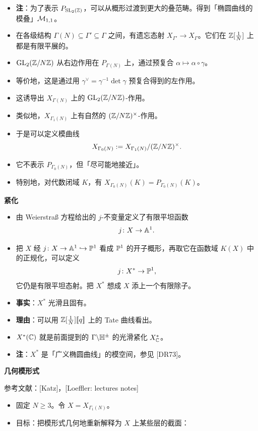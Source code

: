 \begin{itemize}
\item \textbf{注}：为了表示 $P_{\operatorname{SL}_2(\mathbb{Z})}$，可以从概形过渡到更大的叠范畴。得到「椭圆曲线的模叠」$\mathcal{M}_{1,1}$。
\item 在各级结构 $\Gamma(N)\subseteq\Gamma'\subseteq\Gamma$ 之间，有遗忘态射 $X_{\Gamma'}\to X_\Gamma$。它们在 $\mathbb{Z}[\frac1N]$ 上都是有限平展的。
\item $\operatorname{GL}_2(\mathbb{Z}/N\mathbb{Z})$ 从右边作用在 $P_{\Gamma(N)}$ 上，通过预复合 $\alpha\mapsto\alpha\circ\gamma$。
\item 等价地，这是通过用 $\gamma^\vee=\gamma^{-1}\det\gamma$ 预复合得到的左作用。
\item 这诱导出 $X_{\Gamma(N)}$ 上的 $\operatorname{GL}_2(\mathbb{Z}/N\mathbb{Z})$-作用。
\item 类似地，$X_{\Gamma_1(N)}$ 上有自然的 $(\mathbb{Z}/N\mathbb{Z})^\times$-作用。
\item 于是可以定义模曲线
\[
X_{\Gamma_0(N)}:=X_{\Gamma_1(N)}/(\mathbb{Z}/N\mathbb{Z})^\times .
\]
\item 它不表示 $P_{\Gamma_0(N)}$，但「尽可能地接近」。
\item 特别地，对代数闭域 $K$，有 $X_{\Gamma_0(N)}(K)=P_{\Gamma_0(N)}(K)$。
\end{itemize}

\medskip
\noindent\textbf{紧化}
\begin{itemize}
\item 由 Weierstraß 方程给出的 $j$-不变量定义了有限平坦函数
\[
j\colon X\to\mathbb{A}^1 .
\]
\item 把 $X$ 经 $j\colon X\to\mathbb{A}^1\hookrightarrow\mathbb{P}^1$ 看成 $\mathbb{P}^1$ 的开子概形，再取它在函数域 $K(X)$ 中的正规化，可以定义
\[
j\colon X^*\to\mathbb{P}^1,
\]
它仍是有限平坦态射。把 $X^*$ 想成 $X$ 添上一个有限除子。
\item \textbf{事实}：$X^*$ 光滑且固有。
\item \textbf{理由}：可以用 $\mathbb{Z}[\frac1N][\![q]\!]$ 上的 Tate 曲线看出。
\item $X^*(\mathbb{C})$ 就是前面提到的 $\Gamma\backslash\mathbb{H}^\pm$ 的光滑紧化 $X^*_{\mathbb{C}}$。
\item \textbf{注}：$X^*$ 是「广义椭圆曲线」的模空间，参见 [DR73]。
\end{itemize}

\medskip
\noindent\textbf{几何模形式}

\noindent 参考文献：[Katz]，[Loeffler: lectures notes]
\begin{itemize}
\item 固定 $N\ge3$。令 $X=X_{\Gamma_1(N)}$。
\item 目标：把模形式几何地重新解释为 $X$ 上某些层的截面：
\end{itemize}

